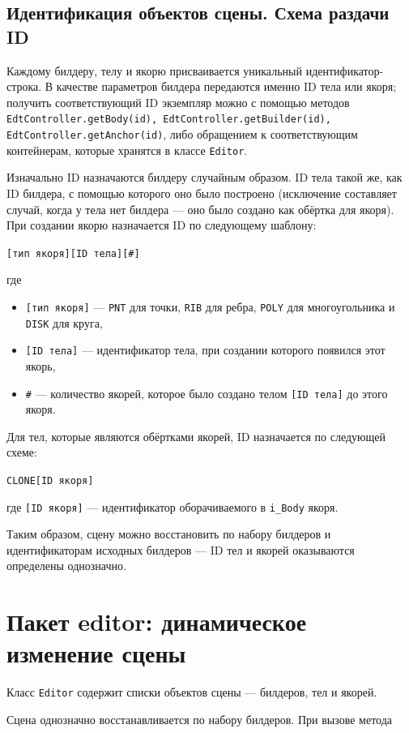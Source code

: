 \documentclass[fontsize=10px, a4paper, openany]{scrbook}
\newcommand{\codeline}[1]{\vspace{5px}\colorbox{light-gray}{\texttt{#1}}\vspace{5px}}
\begin{document}
\section{Идентификация объектов сцены. Схема раздачи ID}

Каждому билдеру, телу и якорю присваивается уникальный идентификатор-строка. В качестве параметров билдера передаются именно ID тела или якоря; получить соответствующий ID экземпляр можно с помощью методов \texttt{EdtController.getBody(id), EdtController.getBuilder(id), EdtController.getAnchor(id)}, либо обращением к соответствующим контейнерам, которые хранятся в классе \texttt{Editor}.

Изначально ID назначаются билдеру случайным образом. ID тела такой же, как ID билдера, с помощью которого оно было построено (исключение составляет случай, когда у тела нет билдера --- оно было создано как обёртка для якоря). При создании якорю назначается ID по следующему шаблону:

\codeline{[тип якоря][ID тела][\#]}

где
\begin{itemize}
\item \texttt{[тип якоря]} --- \texttt{PNT} для точки, \texttt{RIB} для ребра, \texttt{POLY} для многоугольника и \texttt{DISK} для круга,
\item \texttt{[ID тела]} --- идентификатор тела, при создании которого появился этот якорь,
\item \texttt{\#} --- количество якорей, которое было создано телом \texttt{[ID тела]} до этого якоря.
\end{itemize}

Для тел, которые являются обёртками якорей, ID назначается по следующей схеме:

\codeline{CLONE[ID якоря]}

где \texttt{[ID якоря]} --- идентификатор оборачиваемого в \texttt{i\_Body} якоря.


Таким образом, сцену можно восстановить по набору билдеров и идентификаторам исходных билдеров --- ID тел и якорей оказываются определены однозначно.

\chapter{Пакет \textbf{editor}: динамическое изменение сцены}

Класс \texttt{Editor} содержит списки объектов сцены --- билдеров, тел и якорей.

Сцена однозначно восстанавливается по набору билдеров. При вызове метода
\end{document}
